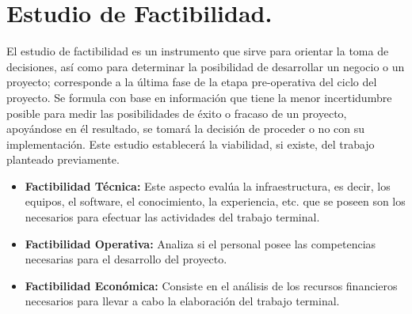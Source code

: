 \documentclass[12pt, a4paper, titlepage]{report}
\begin{document}
    	\section{Estudio de Factibilidad.}
    	El estudio de factibilidad es un instrumento que sirve para orientar la toma de decisiones, así como para determinar la posibilidad de desarrollar un negocio o un proyecto; corresponde a la última fase de la etapa pre-operativa del ciclo del proyecto. Se formula con base en información que tiene la menor incertidumbre posible para medir las posibilidades de éxito o fracaso de un proyecto, apoyándose en él resultado, se tomará la decisión de proceder o no con su implementación. Este estudio establecerá la viabilidad, si existe, del trabajo planteado previamente.
    	\begin{itemize}
    		\item \textbf{Factibilidad Técnica:} Este aspecto evalúa la infraestructura, es decir, los equipos, el software, el conocimiento, la experiencia, etc. que se poseen son los necesarios para efectuar las actividades del trabajo terminal.
    		\item \textbf{Factibilidad Operativa:} Analiza si el personal posee las competencias necesarias para el desarrollo del proyecto.
    		\item \textbf{Factibilidad Econ\'omica:} Consiste en el análisis de los recursos financieros necesarios para llevar a cabo la elaboraci\'on del trabajo terminal.
    	\end{itemize}
\end{document}
